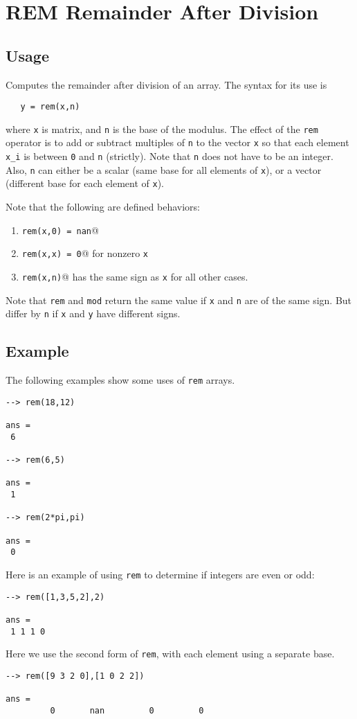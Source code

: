 \section{REM Remainder After Division}

\subsection{Usage}

Computes the remainder after division of an array.  The syntax for its use is
\begin{verbatim}
   y = rem(x,n)
\end{verbatim}
where \verb|x| is matrix, and \verb|n| is the base of the modulus.  The
effect of the \verb|rem| operator is to add or subtract multiples of \verb|n|
to the vector \verb|x| so that each element \verb|x_i| is between \verb|0| and \verb|n|
(strictly).  Note that \verb|n| does not have to be an integer.  Also,
\verb|n| can either be a scalar (same base for all elements of \verb|x|), or a
vector (different base for each element of \verb|x|).

Note that the following are defined behaviors:
\begin{enumerate}
\item  \verb|rem(x,0) = nan|@

\item  \verb|rem(x,x) = 0|@ for nonzero \verb|x|

\item  \verb|rem(x,n)|@ has the same sign as \verb|x| for all other cases.

\end{enumerate}
Note that \verb|rem| and \verb|mod| return the same value if \verb|x| and \verb|n|
are of the same sign.  But differ by \verb|n| if \verb|x| and \verb|y| have 
different signs.
\subsection{Example}

The following examples show some uses of \verb|rem|
arrays.
\begin{verbatim}
--> rem(18,12)

ans = 
 6 

--> rem(6,5)

ans = 
 1 

--> rem(2*pi,pi)

ans = 
 0 
\end{verbatim}
Here is an example of using \verb|rem| to determine if integers are even
 or odd:
\begin{verbatim}
--> rem([1,3,5,2],2)

ans = 
 1 1 1 0 
\end{verbatim}
Here we use the second form of \verb|rem|, with each element using a 
separate base.
\begin{verbatim}
--> rem([9 3 2 0],[1 0 2 2])

ans = 
         0       nan         0         0 
\end{verbatim}
